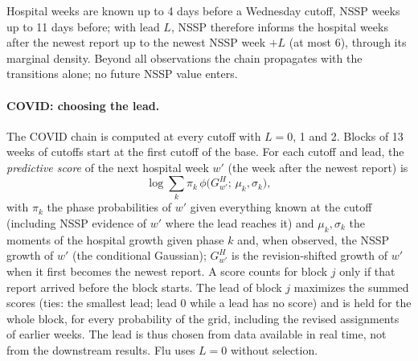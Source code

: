 \documentclass[11pt,a4paper]{article}
\theoremstyle{definition}
\theoremstyle{remark}
\begin{document}
Hospital weeks are known up to 4 days before a Wednesday cutoff, NSSP weeks
up to 11 days before; with lead $L$, NSSP therefore informs the hospital
weeks after the newest report up to the newest NSSP week $+L$ (at most 6),
through its marginal density. Beyond all observations the chain propagates
with the transitions alone; no future NSSP value enters.

\paragraph{COVID: choosing the lead.}
The COVID chain is computed at every cutoff with $L=0$, 1 and 2. Blocks of 13
weeks of cutoffs start at the first cutoff of the base. For each cutoff
and lead, the \emph{predictive score} of the next hospital week $w'$ (the
week after the newest report) is
\[
 \log\sum_k\pi_k\,\phi\bigl(G^H_{w'};\,\mu_k,\sigma_k\bigr),
\]
with $\pi_k$ the phase probabilities of $w'$ given everything known at the
cutoff (including NSSP evidence of $w'$ where the lead reaches it) and
$\mu_k,\sigma_k$ the moments of the hospital growth given phase $k$ and,
when observed, the NSSP growth of $w'$ (the conditional Gaussian); $G^H_{w'}$
is the revision-shifted growth of $w'$ when it first becomes the newest
report. A score counts for block $j$ only if that report arrived before the
block starts. The lead of block $j$ maximizes the summed scores (ties: the
smallest lead; lead 0 while a lead has no score) and is held for the whole
block, for every probability of the grid, including the revised assignments
of earlier weeks. The lead is thus chosen from data available in real
time, not from the downstream results. Flu uses $L=0$ without selection.
\end{document}
